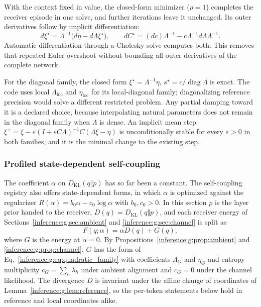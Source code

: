\documentclass[11pt]{article}
\theoremstyle{definition}
\theoremstyle{remark}
\providecommand{\KL}{D_{\mathrm{KL}}}
\providecommand{\diag}{\operatorname{diag}}
\begin{document}
With the context fixed in value, the closed-form minimizer ($\rho=1$) completes the receiver episode in one solve, and further iterations leave it unchanged. Its outer derivatives follow by implicit differentiation:
\begin{equation}
d\xi^\star=\Lambda^{-1}\bigl(d\eta-d\Lambda \xi^\star\bigr),\qquad dC^\star=(dc)\Lambda^{-1}-c\Lambda^{-1}d\Lambda\Lambda^{-1}.
\end{equation}
Automatic differentiation through a Cholesky solve computes both. This removes that repeated Euler overshoot without bounding all outer derivatives of the complete network.

For the diagonal family, the closed form $\xi^\star=\Lambda^{-1}\eta$, $s^\star=c/\diag\Lambda$ is exact. The code uses local $\Lambda_{\mathrm{loc}}$ and $\eta_{\mathrm{loc}}$ for its local-diagonal family; diagonalizing reference precision would solve a different restricted problem. Any partial damping toward it is a declared choice, because interpolating natural parameters does not remain in the diagonal family when $\Lambda$ is dense. An implicit mean step $\xi^+=\xi-\varepsilon(I+\varepsilon C\Lambda)^{-1}C(\Lambda\xi-\eta)$ is unconditionally stable for every $\varepsilon>0$ in both families, and it is the minimal change to the existing step.

\subsubsection{Profiled state-dependent self-coupling}
\label{inference:g:sec:profiled}

The coefficient $\alpha$ on $\KL(q\Vert p)$ has so far been a constant. The self-coupling registry also offers state-dependent forms, in which $\alpha$ is optimized against the regularizer $R(\alpha)=b_0\alpha-c_0\log\alpha$ with $b_0,c_0>0$. In this section $p$ is the layer prior handed to the receiver, $D(q)=\KL(q\Vert p)$, and each receiver energy of Sections~\ref{inference:g:sec:ambient} and \ref{inference:g:sec:channel} is split as
\begin{equation}
F(q;\alpha)=\alpha D(q)+G(q),
\label{inference:g:eq:split}
\end{equation}
where $G$ is the energy at $\alpha=0$. By Propositions~\ref{inference:g:prop:ambient} and \ref{inference:g:prop:channel}, $G$ has the form of Eq.~\eqref{inference:g:eq:quadratic_family} with coefficients $\Lambda_G$ and $\eta_G$ and entropy multiplicity $c_G=\sum_h\lambda_h$ under ambient alignment and $c_G=0$ under the channel likelihood. The divergence $D$ is invariant under the affine change of coordinates of Lemma~\ref{inference:g:lem:reference}, so the per-token statements below hold in reference and local coordinates alike.
\end{document}
